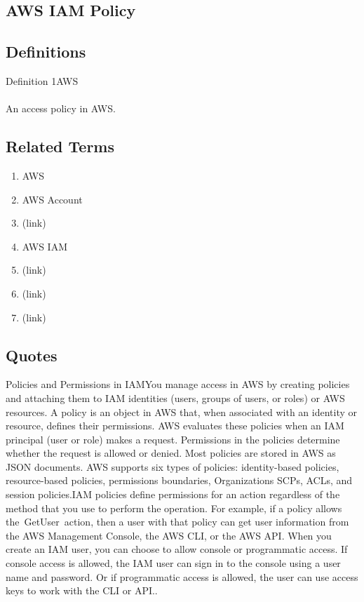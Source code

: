 \newpage \subsection*{AWS IAM Policy } \subsection*{Definitions } \begin{DIC_Def}{Definition 1AWS }{} \paragraph{} An access policy in AWS.  \end{DIC_Def} \subsection*{Related Terms } \begin{enumerate} \item  AWS  \item  AWS Account  \item  (link) \href{AWS Account Root User (Dictionary Entry) }{ }   \item  AWS IAM  \item  (link) \href{AWS IAM Group (Dictionary Entry) }{ }   \item  (link) \href{AWS IAM Role (Dictionary Entry) }{ }   \item  (link) \href{AWS IAM User (Dictionary Entry) }{ }   \end{enumerate} \subsection*{Quotes } \begin{DIC_BlockQuote} Policies and Permissions in IAMYou manage access in AWS by creating policies and attaching them to IAM identities (users, groups of users, or roles) or AWS resources. A policy is an object in AWS that, when associated with an identity or resource, defines their permissions. AWS evaluates these policies when an IAM principal (user or role) makes a request. Permissions in the policies determine whether the request is allowed or denied. Most policies are stored in AWS as JSON documents. AWS supports six types of policies: identity-based policies, resource-based policies, permissions boundaries, Organizations SCPs, ACLs, and session policies.IAM policies define permissions for an action regardless of the method that you use to perform the operation. For example, if a policy allows the~GetUser~action, then a user with that policy can get user information from the AWS Management Console, the AWS CLI, or the AWS API. When you create an IAM user, you can choose to allow console or programmatic access. If console access is allowed, the IAM user can sign in to the console using a user name and password. Or if programmatic access is allowed, the user can use access keys to work with the CLI or API..  \end{DIC_BlockQuote} 
